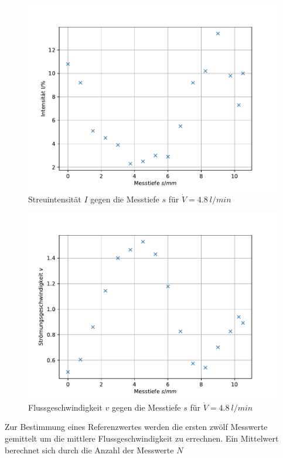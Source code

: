 %
\begin{figure}[h!]
  \centering
  \includegraphics[width=\textwidth]{65prozi.pdf}
  \caption{Streuintensität $I$ gegen die Messtiefe $s$ für $\dot{V}=\SI{4,8}{l/min}$}
  \label{fig:65i}
\end{figure}
%
\begin{figure}[h!]
  \centering
  \includegraphics[width=\textwidth]{65prozv.pdf}
  \caption{Flussgeschwindigkeit $v$ gegen die Messtiefe $s$ für $\dot{V}=\SI{4,8}{l/min}$}
  \label{fig:65v}
\end{figure}
Zur Bestimmung eines Referenzwertes werden die ersten zwölf Messwerte gemittelt um die mittlere Flussgeschwindigkeit zu errechnen.
Ein Mittelwert berechnet sich durch die Anzahl der Messwerte $N$
